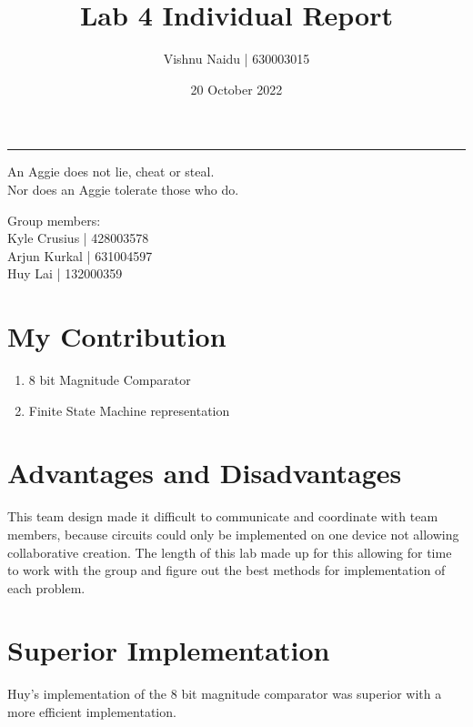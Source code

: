\documentclass[fleqn,12pt]{article}
\title{\vspace{-2.5cm}Lab 4 Individual Report}
\author{
    Vishnu Naidu | 630003015
}
\affil{Texas A\&M University}
\date{\vspace{-28pt}20 October 2022}
\begin{document}
\maketitle
\begin{center}
\vspace{-42pt}
\rule{\textwidth}{.1pt}
{\large
An Aggie does not lie, cheat or steal.\\
Nor does an Aggie tolerate those who do.
}
\end{center}
\begin{center}
Group members:\\
Kyle Crusius | 428003578\\
Arjun Kurkal | 631004597\\
Huy Lai | 132000359
\end{center}

\section*{My Contribution}
\begin{enumerate}
    \item 8 bit Magnitude Comparator
    \item Finite State Machine representation
\end{enumerate}

\section*{Advantages and Disadvantages}
\noindent
This team design made it difficult to communicate and coordinate with team members, because circuits could only be implemented on one device not allowing collaborative creation. The length of this lab made up for this allowing for time to work with the group and figure out the best methods for implementation of each problem. 

\section*{Superior Implementation}
\noindent
Huy's implementation of the 8 bit magnitude comparator was superior with a more efficient implementation. 
\end{document}
